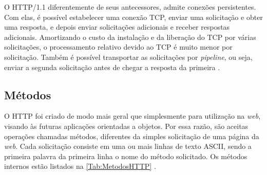 O HTTP/1.1 diferentemente de seus antecessores, admite conexões persistentes. Com elas, é possível estabelecer uma conexão TCP, enviar uma solicitação e obter uma resposta, e depois enviar solicitações adicionais e receber respostas adicionais. Amortizando o custo da instalação e da liberação do TCP por várias solicitações, o processamento relativo devido ao TCP é muito menor por solicitação. Também é possível transportar as solicitações por \textit{pipeline}, ou seja, enviar a segunda solicitação antes de chegar a resposta da primeira \cite{Tanenbaum:2003}.



\subsection{Métodos} \label{subsec:Metodos}

O HTTP foi criado de modo mais geral que simplesmente para utilização na \textit{web}, visando às futuras aplicações orientadas a objetos. Por essa razão, são aceitas operações chamadas métodos, diferentes da simples solicitação de uma página da \textit{web}. Cada solicitação consiste em uma ou mais linhas de texto ASCII, sendo a primeira palavra da primeira linha o nome do método solicitado. Os métodos internos estão listados na \autoref{Tab:MetodosHTTP} \cite{Tanenbaum:2003}.



